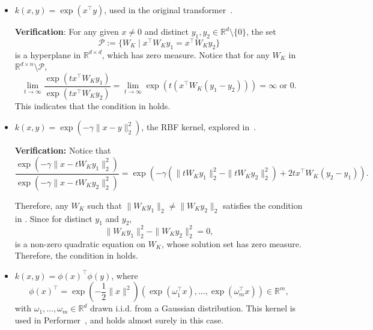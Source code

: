 \documentclass{article}
\begin{document}
\begin{itemize}
    \item $k(x,y)=\exp(x^\top y)$, used in the original transformer~\cite{vaswani2017attention}.

    \textbf{Verification}: 
    For any given $x\neq 0$ and distinct  $y_1,y_2\in\mathbb R^d\setminus \{0\}$, the set
    \begin{equation}
        \mathcal P:=\{W_K\mid x^\top W_Ky_1=x^\top W_Ky_2\}
    \end{equation}
    is a hyperplane in $\mathbb R^{d\times d}$, which has zero measure. Notice that for any $W_K$ in $\mathbb R^{d\times n}\setminus \mathcal P$,
    \begin{equation}
        \lim_{t\to\infty} \frac{\exp(tx^\top W_Ky_1)}{\exp(tx^\top W_Ky_2)}=\lim_{t\to\infty} \exp(t(x^\top W_K(y_1-y_2)))=\infty \text{ or } 0.
    \end{equation}
    This indicates that the condition in  holds.
    \item $k(x,y)=\exp(-\gamma \|x-y\|_2^2)$, the RBF kernel, explored in~\cite{tsai2019transformer}.

    \textbf{Verification:} Notice that
    \begin{equation}
        \frac{\exp(-\gamma\|x-tW_Ky_1\|_2^2)}{\exp(-\gamma\|x-tW_Ky_2\|_2^2)}=\exp(-\gamma(\|tW_Ky_1\|_2^2-\|tW_Ky_2\|_2^2)+2tx^\top W_K (y_2-y_1)).
    \end{equation}

    Therefore, any $W_K$ such that $\|W_Ky_1\|_2\neq \|W_Ky_2\|_2$ satisfies the condition in . Since for distinct $y_1$ and $y_2$,
\begin{equation}
    \|W_Ky_1\|_2^2-\|W_Ky_2\|_2^2= 0,
\end{equation}
is a non-zero quadratic equation on $W_K$, whose solution set has zero measure. Therefore, the condition in  holds.

    \item $k(x,y)=\phi(x)^\top\phi(y)$, where
    \begin{equation}
        \phi(x)^{\top}=\exp \left(-\frac{1}{2}\|x\|^2\right)\left(\exp ({\omega}_1^{\top} x), \ldots, \exp ({\omega}_m^{\top} x)\right)\in\mathbb{R}^m,
    \end{equation}
    with $\omega_1,\dots, \omega_m\in\mathbb{R}^d$ drawn i.i.d. from a Gaussian distribution. This kernel is used in Performer~\cite{choromanski2020rethinking}, and  holds almost surely in this case.


\end{itemize}
\end{document}
